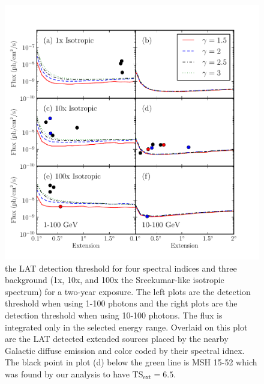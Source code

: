 \documentclass[12pt,preprint]{aastex}
\newcommand{\gev}{\text{GeV}\xspace}
\newcommand{\tsext}{{\ensuremath{\text{TS}_{\text{ext}}}}\xspace}
\begin{document}
\begin{figure}
  \begin{center}
    \includegraphics{mc_plots/all_sensitivity.pdf}
    \end{center}
    \caption{the LAT detection threshold for four spectral indices and
    three background (1x, 10x, and 100x the Sreekumar-like isotropic
    spectrum) for a two-year exposure. The left plots are the detection
    threshold when using 1-100 \gev photons and the right plots are
    the detection threshold when using 10-100 \gev photons.  The flux
    is integrated only in the selected energy range.  Overlaid on this
    plot are the LAT detected extended sources placed by the nearby
    Galactic diffuse emission and color coded by their spectral idnex.
    The black point in plot (d) below the green line is MSH 15-52 which
    was found by our analysis to have $\tsext=6.5$.  
    }\label{all_sensitivity} 
  \end{figure}
\end{document}
